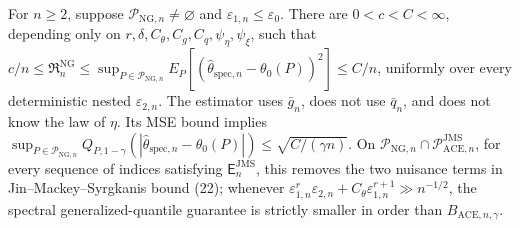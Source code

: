 For \(n\ge2\), suppose \(\mathcal P_{\mathrm{NG},n}\neq\varnothing\) and \(\varepsilon_{1,n}\le\varepsilon_0\). There are \(0<c<C<\infty\), depending only on \(r,\delta,C_{\theta},C_g,C_q,\psi_{\eta},\psi_{\xi}\), such that \(c/n\le\mathfrak R_n^{\mathrm{NG}}\le\sup_{P\in\mathcal P_{\mathrm{NG},n}}E_P[(\widehat\theta_{\mathrm{spec},n}-\theta_0(P))^2]\le C/n\), uniformly over every deterministic nested \(\varepsilon_{2,n}\). The estimator uses \(\bar g_n\), does not use \(\bar q_n\), and does not know the law of \(\eta\). Its MSE bound implies \(\sup_{P\in\mathcal P_{\mathrm{NG},n}}Q_{P,1-\gamma}(|\widehat\theta_{\mathrm{spec},n}-\theta_0(P)|)\le\sqrt{C/(\gamma n)}\). On \(\mathcal P_{\mathrm{NG},n}\cap\mathcal P_{\mathrm{ACE},n}^{\mathrm{JMS}}\), for every sequence of indices satisfying \(\mathsf E_n^{\mathrm{JMS}}\), this removes the two nuisance terms in Jin--Mackey--Syrgkanis bound (22); whenever \(\varepsilon_{1,n}^r\varepsilon_{2,n}+C_{\theta}\varepsilon_{1,n}^{r+1}\gg n^{-1/2}\), the spectral generalized-quantile guarantee is strictly smaller in order than \(B_{\mathrm{ACE},n,\gamma}\).